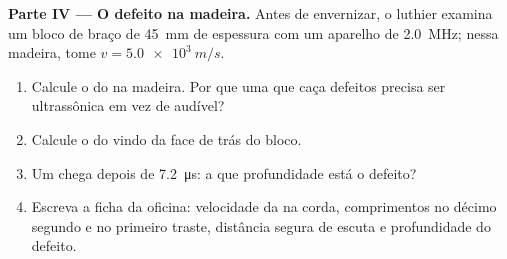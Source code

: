 \begin{problem}
\medskip
\noindent\textbf{Parte IV --- O defeito na madeira.}
Antes de envernizar, o luthier examina um bloco de braço de \qty{45}{mm}
de espessura com um aparelho de \qty{2.0}{MHz}; nessa madeira, tome
$v = \qty{5.0e3}{m/s}$.
\begin{enumerate}[resume]
  \item Calcule o  do  na madeira. Por que
        uma  que caça defeitos precisa ser ultrassônica em vez de
        audível?
  \item Calcule o  do  vindo da face de trás do bloco.
  \item Um  chega depois de \qty{7.2}{\micro s}: a que profundidade
        está o defeito?
  \item Escreva a ficha da oficina: velocidade da  na corda,
        comprimentos no décimo segundo e no primeiro traste, distância
        segura de escuta e profundidade do defeito.
\end{enumerate}
\end{problem}
